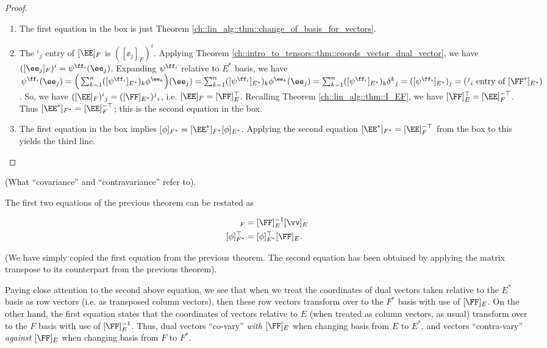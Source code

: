 \begin{proof} \mbox{} \\ \indent
    \begin{enumerate}
        \item The first equation in the box is just Theorem \ref{ch::lin_alg::thm::change_of_basis_for_vectors}.
        
        \item The $^i{}_j$ entry of $[\EE]_F$ is $([\ee_j]_F)^i$. Applying Theorem \ref{ch::intro_to_tensors::thm::coords_vector_dual_vector}, we have $([\ee_j]_F)^i = \psi^{\ff_i}(\ee_j)$. Expanding $\psi^{\ff_i}$ relative to $E^*$ basis, we have $\psi^{\ff_i}(\ee_j) = \Big(\sum_{k = 1}^n ([\psi^{\ff_i}]_{E^*})_k \phi^{\ee_k} \Big)(\ee_j) = \sum_{k = 1}^n ([\psi^{\ff_i}]_{E^*})_k \phi^{\ee_k}(\ee_j) = \sum_{k = 1}^n ([\psi^{\ff_i}]_{E^*})_k \delta^k{}_j = ([\psi^{\ff_i}]_{E^*})_j = (\text{$^j{}_i$ entry of $[\FF^*]_{E^*}$})$. So, we have $([\EE]_F)^i{}_j = ([\FF]_{E^*})^j{}_i$, i.e. $[\EE]_F = [\FF]_E^\top$. Recalling Theorem \ref{ch::lin_alg::thm::I_EF}, we have $[\FF]_E^\top = [\EE]_F^{-\top}$. Thus $[\EE^*]_{F^*} = [\EE]_F^{-\top}$; this is the second equation in the box.

        \item The first equation in the box implies $[\phi]_{F^*} = [\EE^*]_{F^*} [\phi]_{E^*}$. Applying the second equation $[\EE^*]_{F^*} = [\EE]_F^{-\top}$ from the box to this yields the third line.
    \end{enumerate}
\end{proof}

\begin{remark}
\label{ch::intro_to_tensors::rmk::covar_contarvar_real_meaning}

    (What ``covariance'' and ``contravariance'' refer to).

    The first two equations of the previous theorem can be restated as
    
    \begin{align*}
        [\vv]_F &= [\FF]_E^{-1} [\vv]_E \\
        [\phi]_{F^*}^\top &= [\phi]_{E^*}^\top [\FF]_E.
    \end{align*}
    
    (We have simply copied the first equation from the previous theorem. The second equation has been obtained by applying the matrix transpose to its counterpart from the previous theorem).
    
    Paying close attention to the second above equation, we see that when we treat the coordinates of dual vectors taken relative to the $E^*$ basis as row vectors (i.e. as transposed column vectors), then these row vectors transform over to the $F^*$ basis with use of $[\FF]_E$. On the other hand, the first equation states that the coordinates of vectors relative to $E$ (when treated as column vectors, as usual) transform over to the $F$ basis with use of $[\FF]_E^{-1}$. Thus, dual vectors ``co-vary'' \textit{with} $[\FF]_E$ when changing basis from $E$ to $E^*$, and vectors ``contra-vary'' \textit{against} $[\FF]_E$ when changing basis from $F$ to $F^*$.
\end{remark}

